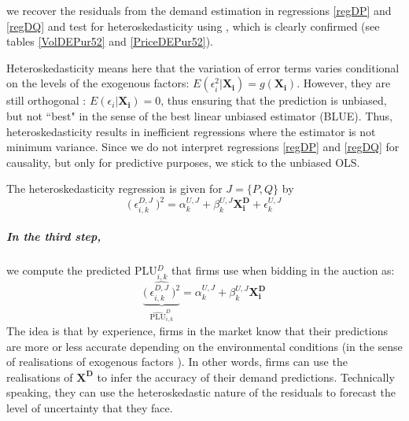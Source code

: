 
we recover the residuals from the demand estimation in regressions \ref{regDP} and \ref{regDQ} and test for heteroskedasticity using \cite{white1980heteroskedasticity}, which is clearly confirmed (see tables \ref{VolDEPur52} and \ref{PriceDEPur52}). 

Heteroskedasticity means here that the variation of error terms varies conditional on the levels of the exogenous factors: $E(\epsilon_i^2 \vert \boldsymbol{X_i})=g(\boldsymbol{X_i})$. However, they are still orthogonal%
: $E(\epsilon_i \vert \boldsymbol{X_i})=0$, thus ensuring that the prediction is unbiased, but not ``best" in the sense of the best linear unbiased estimator (BLUE). Thus, heteroskedasticity results in inefficient regressions where the estimator is not minimum variance. 
Since we do not interpret regressions \ref{regDP} and \ref{regDQ} for causality, but only for predictive purposes, we stick to the unbiased OLS. 

The heteroskedasticity regression is given for $J=\{P,Q\}$ by
\begin{equation}
\label{heteroskedeqn}
 \bigl( \: \epsilon_{i,k}^{D,J}\: \bigr)^2= \alpha^{U,J}_{k} + \beta^{U,J}_{k} \boldsymbol{X^D_i} 
 +\epsilon^{U,J}_{k}
\end{equation}



\subparagraph{In the third step,} we compute the predicted PLU$^D_{i,k}$ that firms use when bidding in the auction as:
\begin{equation}
\label{predictu}
 \underbrace{ \widehat{ \bigl( \: \epsilon_{i,k}^{D,J}\: \bigr)^2}}_{\widehat{\text{PLU}}^D_{i,k}}= \alpha^{U,J}_{k} + \beta^{U,J}_{k} \boldsymbol{X^D_i} 
\end{equation}
The idea is that by experience, firms in the market know that their predictions are more or less accurate depending on the environmental conditions (in the sense of realisations of exogenous factors%
). In other words, firms can use the realisations of $ \boldsymbol{X^D}$ to infer the accuracy of their demand predictions. %
 Technically speaking, they can use the heteroskedastic nature of the residuals to forecast the level of uncertainty that they face.


